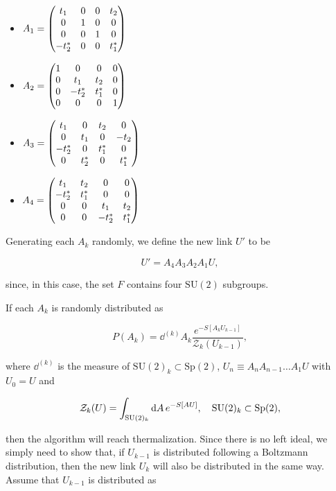 \documentclass[reqno,12pt]{article}
\numberwithin{equation}{section}
\newcommand{\SU}{\mathrm{SU}}
\newcommand{\Sp}{\mathrm{Sp}}
\begin{document}
\begin{itemize}
	\item $A_1 = \mqty(
		t_1 & 0 & 0 & t_2 \\
		0 & 1 & 0 & 0 \\
		0 & 0 & 1 & 0 \\
		-t^*_2 & 0 & 0 & t^*_1 
		)$
	\item $A_2 = \mqty(
		1 & 0 & 0 & 0 \\
		0 & t_1 & t_2 & 0 \\
		0 & -t^*_2 & t^*_1 & 0 \\
		0 & 0 & 0 & 1 
		)$
	\item $A_3 = \mqty(
		t_1 & 0 & t_2 & 0 \\
		0 & t_1 & 0 & -t_2 \\
		-t_2^* & 0 & t^*_1 & 0 \\
		0 & t^*_2 & 0 & t^*_1 
		)$
	\item $A_4 = \mqty(
		t_1 & t_2 & 0 & 0 \\
		-t^*_2 & t^*_1 & 0 & 0 \\
		0 & 0 & t_1 & t_2  \\
		0 & 0 & -t^*_2 & t^*_1 
		)$
\end{itemize}

Generating each $A_k$ randomly, we define the new link $U'$ to be

\begin{equation} \label{eq:heatbath_newlink}
	U' = A_4 A_3 A_2 A_1 U,
\end{equation}

since, in this case, the set $F$ contains four $\SU(2)$ subgroups.

If each $A_k$ is randomly distributed as

\begin{equation} \label{eq:probdist}
	P(A_k) = \dd^{(k)}{A_k} \frac{e^{-S[A_k U_{k-1}]}}{\mathcal{Z}_k(U_{k-1})},
\end{equation}

where $\dd^{(k)}$ is the measure of $\SU(2)_k \subset \Sp(2)$, $U_{n} \equiv A_n A_{n-1} \dots A_1 U$ with $U_0 = U$ and 

\begin{equation}
	\mathcal{Z}_k(U) = \int_{\SU(2)_k} \dd{A} e^{-S[AU]} \qc \SU(2)_k \subset \Sp(2),
\end{equation}

then the algorithm will reach thermalization. Since there is no left ideal, we simply need to show that, if $U_{k-1}$
is distributed following a Boltzmann distribution, then the new link $U_k$ will also be distributed in the same way.
Assume that $U_{k-1}$ is distributed as
\end{document}
